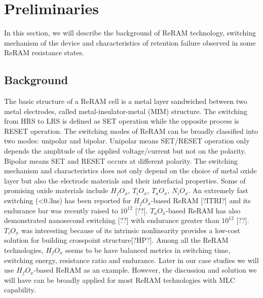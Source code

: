 \section{Preliminaries} \label{sec:preliminary}

In this section, we will describe the background of ReRAM technology, switching mechanism of the device and characteristics of retention failure observed in some ReRAM resistance states.

\subsection{Background}
The basic structure of a ReRAM cell is a metal layer sandwiched between two metal electrodes, called metal-insulator-metal (MIM) structure. The switching from HRS to LRS is defined as SET operation while the opposite process is RESET operation. The switching modes of ReRAM can be broadly classified into two modes: unipolar and bipolar. Unipolar means SET/RESET operation only depends the amplitude of the applied voltage/current but not on the polarity. Bipolar means SET and RESET occurs at different polarity. The switching mechanism and characteristics does not only depend on the choice of metal oxide layer but also the electrode materials and their interfacial properties. Some of promising oxide materials include $H_fO_x$, $T_iO_x$, $T_aO_x$, $N_iO_x$. An extremely fast switching (<0.3ns) has been reported for $H_fO_x$-based ReRAM [?ITRI?] and its endurance bar was recently raised to $10^{12}$ [??]. $T_aO_x$-based ReRAM has also demonstrated nanosecond switching [??] with endurance greater than $10^{12}$ [??]. $T_iO_x$ was interesting because of its intrinsic nonlinearity provides a low-cost solution for building crosspoint structure[?HP?]. Among all the ReRAM technologies, $H_fO_x$ seems to be have balanced metrics in switching time, switching energy, resistance ratio and endurance. Later in our case studies we will use $H_fO_x$-based ReRAM as an example. However, the discussion and solution we will have can be broadly applied for most ReRAM technologies with MLC capability.

